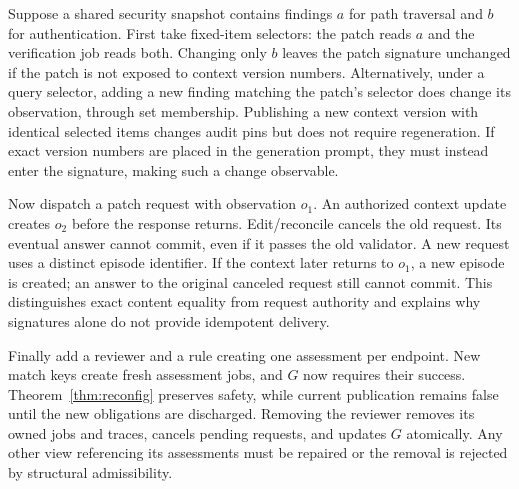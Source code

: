 \documentclass[pdflatex,sn-mathphys-num]{sn-jnl}
\theoremstyle{thmstyleone}
\theoremstyle{thmstylethree}
\theoremstyle{thmstyletwo}
\begin{document}
Suppose a shared security snapshot contains findings $a$ for path traversal and $b$ for authentication. First take fixed-item selectors: the patch reads $a$ and the verification job reads both. Changing only $b$ leaves the patch signature unchanged if the patch is not exposed to context version numbers. Alternatively, under a query selector, adding a new finding matching the patch's selector does change its observation, through set membership. Publishing a new context version with identical selected items changes audit pins but does not require regeneration. If exact version numbers are placed in the generation prompt, they must instead enter the signature, making such a change observable.

Now dispatch a patch request with observation $o_1$. An authorized context update creates $o_2$ before the response returns. Edit/reconcile cancels the old request. Its eventual answer cannot commit, even if it passes the old validator. A new request uses a distinct episode identifier. If the context later returns to $o_1$, a new episode is created; an answer to the original canceled request still cannot commit. This distinguishes exact content equality from request authority and explains why signatures alone do not provide idempotent delivery.

Finally add a reviewer and a rule creating one assessment per endpoint. New match keys create fresh assessment jobs, and $G$ now requires their success. Theorem~\ref{thm:reconfig} preserves safety, while current publication remains false until the new obligations are discharged. Removing the reviewer removes its owned jobs and traces, cancels pending requests, and updates $G$ atomically. Any other view referencing its assessments must be repaired or the removal is rejected by structural admissibility.
\end{document}
